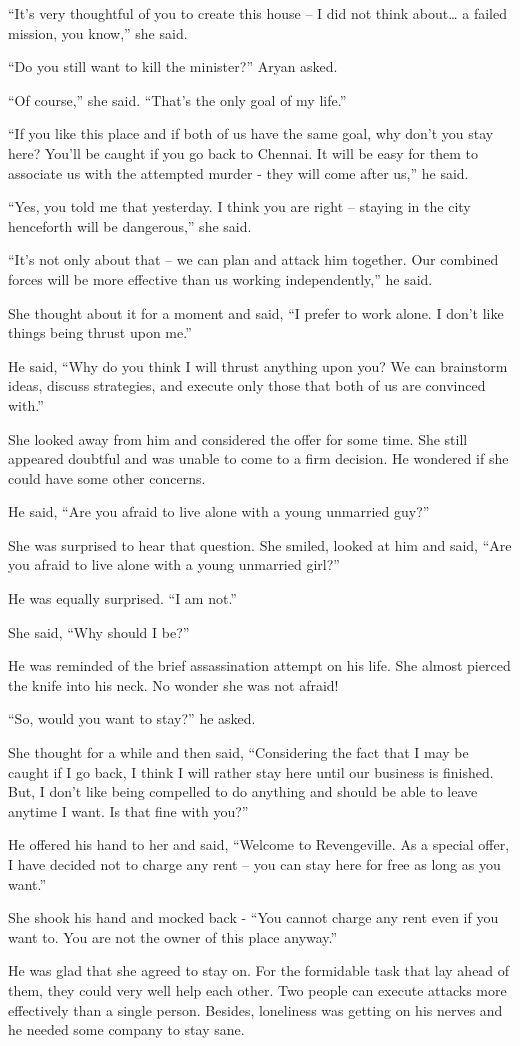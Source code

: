 “It's very thoughtful of you to create this house – I did not think about…
a failed mission, you know,” she said.

“Do you still want to kill the minister?” Aryan asked.

“Of course,” she said. “That's the only goal of my life.”

“If you like this place and if both of us have the same goal, why don't you stay
here? You'll be caught if you go back to Chennai. It will be easy for them to
associate us with the attempted murder - they will come after us,” he said.

“Yes, you told me that yesterday. I think you are right – staying in the city
henceforth will be dangerous,” she said.

“It's not only about that – we can plan and attack him together. Our combined
forces will be more effective than us working independently,” he said.

She thought about it for a moment and said, “I prefer to work alone. I don't
like things being thrust upon me.”

He said, “Why do you think I will thrust anything upon you? We can brainstorm
ideas, discuss strategies, and execute only those that both of us are convinced
with.”

She looked away from him and considered the offer for some time. She still
appeared doubtful and was unable to come to a firm decision. He wondered if she
could have some other concerns.

He said, “Are you afraid to live alone with a young unmarried guy?”

She was surprised to hear that question. She smiled, looked at him and said,
“Are you afraid to live alone with a young unmarried girl?”

He was equally surprised. “I am not.”

She said, “Why should I be?”

He was reminded of the brief assassination attempt on his life. She almost
pierced the knife into his neck. No wonder she was not afraid!

“So, would you want to stay?” he asked.

She thought for a while and then said, “Considering the fact that I may be
caught if I go back, I think I will rather stay here until our business is
finished. But, I don't like being compelled to do anything and should be able
to leave anytime I want. Is that fine with you?”

He offered his hand to her and said, “Welcome to Revengeville. As a special
offer, I have decided not to charge any rent – you can stay here for free as
long as you want.”

She shook his hand and mocked back - “You cannot charge any rent even if you
want to. You are not the owner of this place anyway.”

He was glad that she agreed to stay on. For the formidable task that lay ahead
of them, they could very well help each other. Two people can execute attacks
more effectively than a single person. Besides, loneliness was getting on his
nerves and he needed some company to stay sane.